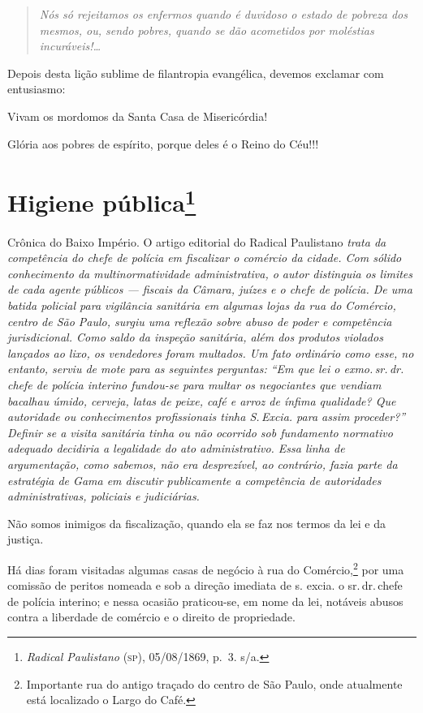 \begin{quote}
\emph{Nós só rejeitamos os enfermos quando é duvidoso o estado de
pobreza dos mesmos, ou, sendo pobres, quando se dão acometidos por
moléstias incuráveis!\ldots{}}
\end{quote}

Depois desta lição sublime de filantropia evangélica, devemos exclamar
com entusiasmo:

Vivam os mordomos da Santa Casa de Misericórdia!

Glória aos pobres de espírito, porque deles é o Reino do Céu!!!

\chapter{Higiene pública\footnote{\emph{Radical Paulistano} (\textsc{sp}),
  05/08/1869, p.~3. s/a.}}

\begin{didascalia}
Crônica do Baixo Império. O artigo editorial do Radical Paulistano
\emph{trata da competência do chefe de polícia em fiscalizar o comércio
da cidade. Com sólido conhecimento da multinormatividade administrativa,
o autor distinguia os limites de cada agente públicos --- fiscais da
Câmara, juízes e o chefe de polícia. De uma batida policial para
vigilância sanitária em algumas lojas da rua do Comércio, centro de São
Paulo, surgiu uma reflexão sobre abuso de poder e competência
jurisdicional. Como saldo da inspeção sanitária, além dos produtos
violados lançados ao lixo, os vendedores foram multados. Um fato
ordinário como esse, no entanto, serviu de mote para as seguintes
perguntas: ``Em que lei o exmo.\,sr.\,dr.\,chefe de polícia interino
fundou-se para multar os negociantes que vendiam bacalhau úmido,
cerveja, latas de peixe, café e arroz de ínfima qualidade? Que
autoridade ou conhecimentos profissionais tinha S.\,Excia. para assim
proceder?'' Definir se a visita sanitária tinha ou não ocorrido sob
fundamento normativo adequado decidiria a legalidade do ato
administrativo. Essa linha de argumentação, como sabemos, não era
desprezível, ao contrário, fazia parte da estratégia de Gama em discutir
publicamente a competência de autoridades administrativas, policiais e
judiciárias.}
\end{didascalia}



Não somos inimigos da fiscalização, quando ela se faz nos termos da lei
e da justiça.

Há dias foram visitadas algumas casas de negócio à rua do
Comércio,\footnote{Importante rua do antigo traçado do centro de São
  Paulo, onde atualmente está localizado o Largo do Café.} por uma
comissão de peritos nomeada e sob a direção imediata de s. excia. o sr.\,dr.\,chefe de polícia interino; e nessa ocasião praticou-se, em nome da
lei, notáveis abusos contra a liberdade de comércio e o direito de
propriedade.

